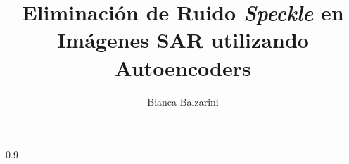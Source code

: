 \documentclass[a4paper,12pt,spanish,customfont,numbered,print,index]{PhDThesisPSnPDF}
\title{Eliminación de Ruido \emph{Speckle} en Imágenes SAR utilizando Autoencoders}
\author{Bianca Balzarini}
\begin{document}
\setlength{\parskip}{0.4em} %
	
	\frontmatter
	
	\maketitle
	
%	
%	
%	
%	
	
	
	\tableofcontents
	
	\listoffigures
	
	\listoftables
	
	
	\printnomenclature
	
	\mainmatter
	
	
	
        
	
	
	
	
	
	
	\backmatter
	
	\begin{spacing}{0.9}
		

            \nocite{*}
		
		\cleardoublepage
		
		
		
		
		
	\end{spacing}
	
\end{document}
